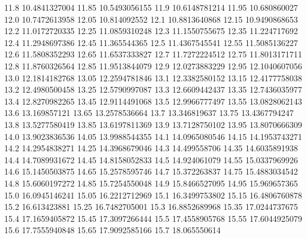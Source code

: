            11.8    10.4841327004
          11.85    10.5493056155
           11.9    10.6148781214
          11.95     10.680860027
           12.0    10.7472613958
          12.05     10.814092552
           12.1    10.8813640868
          12.15    10.9490868653
           12.2    11.0172720335
          12.25    11.0859310248
           12.3    11.1550755675
          12.35     11.224717692
           12.4    11.2948697386
          12.45     11.365544365
           12.5    11.4367545541
          12.55    11.5085136227
           12.6    11.5808352293
          12.65    11.6537333827
           12.7    11.7272224512
          12.75    11.8013171711
           12.8    11.8760326564
          12.85    11.9513844079
           12.9    12.0273883229
          12.95    12.1040607056
           13.0    12.1814182768
          13.05    12.2594781846
           13.1    12.3382580152
          13.15    12.4177758038
           13.2    12.4980500458
          13.25    12.5790997087
           13.3    12.6609442437
          13.35    12.7436035977
           13.4    12.8270982265
          13.45    12.9114491068
           13.5    12.9966777497
          13.55    13.0828062143
           13.6     13.169857121
          13.65    13.2578536664
           13.7     13.346819637
          13.75    13.4367794247
           13.8    13.5277580419
          13.85    13.6197811369
           13.9    13.7128750102
          13.95    13.8070666309
           14.0    13.9023836536
          14.05    13.9988544355
           14.1    14.0965080546
          14.15    14.1953743271
           14.2    14.2954838271
          14.25    14.3968679046
           14.3     14.499558706
          14.35    14.6035891938
           14.4    14.7089931672
          14.45    14.8158052833
           14.5     14.924061079
          14.55    15.0337969926
           14.6    15.1450503875
          14.65    15.2578595746
           14.7     15.372263837
          14.75    15.4883034542
           14.8    15.6060197272
          14.85    15.7254550048
           14.9    15.8466527095
          14.95     15.969657365
           15.0    16.0945146241
          15.05    16.2212712969
           15.1    16.3499753802
          15.15    16.4806760878
           15.2     16.613423881
          15.25    16.7482705001
           15.3    16.8852689968
          15.35    17.0244737675
           15.4    17.1659405872
          15.45    17.3097266444
           15.5    17.4558905768
          15.55    17.6044925079
           15.6    17.7555940848
          15.65    17.9092585166
           15.7     18.065550614
